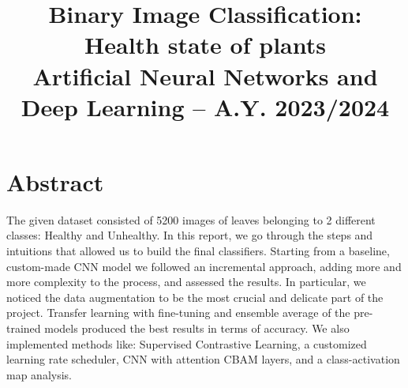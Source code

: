 \documentclass[conference,compsoc,11pt]{IEEEtran}
\begin{document}
\title{Binary Image Classification:\\ Health state of plants
\\ \large Artificial Neural Networks and Deep Learning -- A.Y. 2023/2024}

\author{
}
\maketitle


\IEEEpeerreviewmaketitle

\section{Abstract}
The given dataset consisted of  5200 images of leaves belonging to 2 different classes: Healthy and Unhealthy. 
In this report, we go through the steps and intuitions that allowed us to build the final classifiers. 
Starting from a baseline, custom-made CNN model we followed an incremental approach, adding more and more complexity to the process, and assessed the results. In particular, we noticed the data augmentation to be the most crucial and  delicate part of the project. Transfer learning with fine-tuning and ensemble average of  the pre-trained models produced the best results in terms of accuracy. We also implemented methods like: Supervised Contrastive Learning, a customized learning rate scheduler, CNN with attention CBAM layers, and a class-activation map analysis. 
\end{document}
